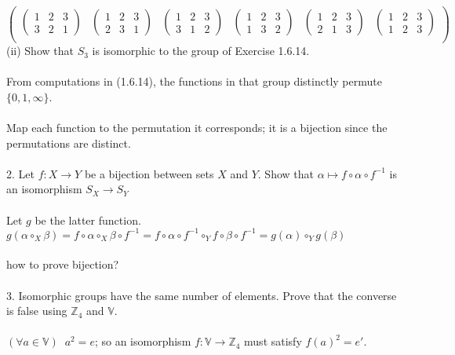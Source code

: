 \documentclass{article}
\begin{document}
\begin{siderules}
\[\begin{pmatrix}
\begin{pmatrix}1&2&3\\3&2&1\end{pmatrix}&\begin{pmatrix}1&2&3\\2&3&1\end{pmatrix}&\begin{pmatrix}1&2&3\\3&1&2\end{pmatrix}&\begin{pmatrix}1&2&3\\1&3&2\end{pmatrix}&\begin{pmatrix}1&2&3\\2&1&3\end{pmatrix}&\begin{pmatrix}1&2&3\\1&2&3\end{pmatrix}\\\end{pmatrix}\]
\color{blue} (ii) Show that \(S_{3}\) is isomorphic to the group of Exercise 1.6.14.\color{black}\\\\
\null\qquad From computations in \color{gray} (1.6.14)\color{black}, the functions in that group distinctly permute \(\{0,1,\infty\}\).\\\\
\null\qquad Map each function to the permutation it corresponds; it is a bijection since the permutations are distinct.\\\\
\color{blue} 2. Let \(f: X\to Y\) be a bijection between sets \(X\) and \(Y\). Show that \(\alpha\mapsto f\circ\alpha\circ f^{-1}\) is an isomorphism \(S_{X}\to S_{Y}\)\color{black}\\\\
\null\qquad Let \(g\) be the latter function. \(g(\alpha\circ_{X}\beta)=f\circ\alpha\circ_{X}\beta\circ f^{-1}=f\circ\alpha\circ f^{-1}\circ_{Y} f\circ\beta\circ f^{-1}=g(\alpha)\circ_{Y}g(\beta)\)\\\\
\null\qquad how to prove bijection?\\\\
\color{blue} 3. Isomorphic groups have the same number of elements. Prove that the converse is false using \(\mathbb{Z}_4\) and \(\mathbb{V}\).\\\\\color{black}
\null\qquad \((\forall a\in\mathbb{V})\;\; a^2=e\); so an isomorphism \(f:\mathbb{V}\to\mathbb{Z}_4\) must satisfy \(f(a)^2=e'\).\\\\

\end{siderules}
\end{document}
